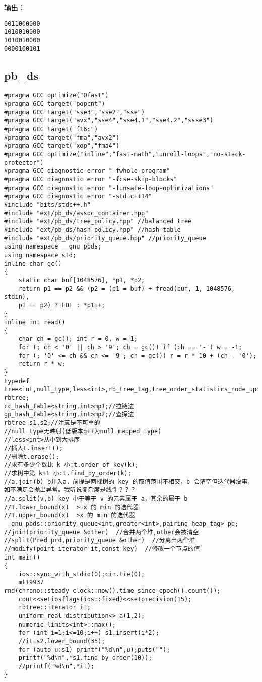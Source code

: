 \documentclass{ctexart}
\begin{document}
输出：

\begin{verbatim}
0011000000
1010010000
1010010000
0000100101
\end{verbatim}

\subsection{pb\_ds}

\begin{lstlisting}
#pragma GCC optimize("Ofast")
#pragma GCC target("popcnt")
#pragma GCC target("sse3","sse2","sse")
#pragma GCC target("avx","sse4","sse4.1","sse4.2","ssse3")
#pragma GCC target("f16c")
#pragma GCC target("fma","avx2")
#pragma GCC target("xop","fma4")
#pragma GCC optimize("inline","fast-math","unroll-loops","no-stack-protector")
#pragma GCC diagnostic error "-fwhole-program"
#pragma GCC diagnostic error "-fcse-skip-blocks"
#pragma GCC diagnostic error "-funsafe-loop-optimizations"
#pragma GCC diagnostic error "-std=c++14"
#include "bits/stdc++.h"
#include "ext/pb_ds/assoc_container.hpp"
#include "ext/pb_ds/tree_policy.hpp" //balanced tree
#include "ext/pb_ds/hash_policy.hpp" //hash table
#include "ext/pb_ds/priority_queue.hpp" //priority_queue
using namespace __gnu_pbds;
using namespace std;
inline char gc()
{
    static char buf[1048576], *p1, *p2;
    return p1 == p2 && (p2 = (p1 = buf) + fread(buf, 1, 1048576, stdin),
    p1 == p2) ? EOF : *p1++;
}
inline int read()
{
    char ch = gc(); int r = 0, w = 1;
    for (; ch < '0' || ch > '9'; ch = gc()) if (ch == '-') w = -1;
    for (; '0' <= ch && ch <= '9'; ch = gc()) r = r * 10 + (ch - '0');
    return r * w;
}
typedef tree<int,null_type,less<int>,rb_tree_tag,tree_order_statistics_node_update> rbtree;
cc_hash_table<string,int>mp1;//拉链法
gp_hash_table<string,int>mp2;//查探法
rbtree s1,s2;//注意是不可重的
//null_type无映射(低版本g++为null_mapped_type)
//less<int>从小到大排序
//插入t.insert();
//删除t.erase();
//求有多少个数比 k 小:t.order_of_key(k);
//求树中第 k+1 小:t.find_by_order(k);
//a.join(b) b并入a，前提是两棵树的 key 的取值范围不相交，b 会清空但迭代器没事，如不满足会抛出异常。我听说复杂度是线性？？？
//a.split(v,b) key 小于等于 v 的元素属于 a，其余的属于 b
//T.lower_bound(x)  >=x 的 min 的迭代器
//T.upper_bound(x)  >x 的 min 的迭代器
__gnu_pbds::priority_queue<int,greater<int>,pairing_heap_tag> pq;
//join(priority_queue &other)  //合并两个堆,other会被清空
//split(Pred prd,priority_queue &other)  //分离出两个堆
//modify(point_iterator it,const key)  //修改一个节点的值
int main()
{
	ios::sync_with_stdio(0);cin.tie(0);
	mt19937 rnd(chrono::steady_clock::now().time_since_epoch().count());
    cout<<setiosflags(ios::fixed)<<setprecision(15);
	rbtree::iterator it;
    uniform_real_distribution<> a(1,2);
	numeric_limits<int>::max();
	for (int i=1;i<=10;i++) s1.insert(i*2);
	//it=s2.lower_bound(35);
	for (auto u:s1) printf("%d\n",u);puts("");
	printf("%d\n",*s1.find_by_order(10));
	//printf("%d\n",*it);
}
\end{lstlisting}
\end{document}
